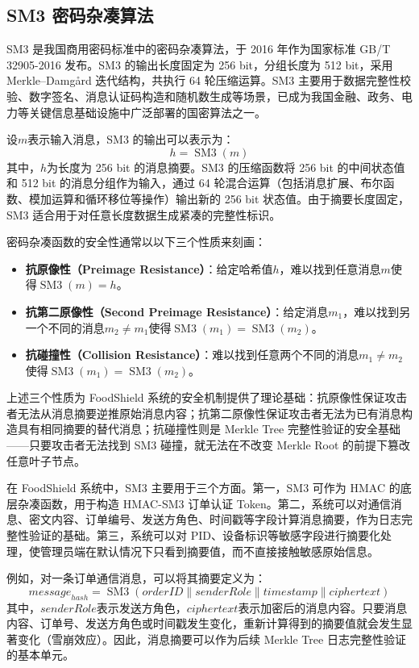 \subsection{SM3 密码杂凑算法}

SM3 是我国商用密码标准中的密码杂凑算法，于 2016 年作为国家标准 GB/T 32905-2016 发布\cite{gb_sm3}。SM3 的输出长度固定为 256 bit，分组长度为 512 bit，采用 Merkle--Damg\r{a}rd 迭代结构，共执行 64 轮压缩运算。SM3 主要用于数据完整性校验、数字签名、消息认证码构造和随机数生成等场景，已成为我国金融、政务、电力等关键信息基础设施中广泛部署的国密算法之一。

设$m$表示输入消息，SM3 的输出可以表示为：
\begin{equation}
h = \operatorname{SM3}(m)
\end{equation}
其中，$h$为长度为 256 bit 的消息摘要。SM3 的压缩函数将 256 bit 的中间状态值和 512 bit 的消息分组作为输入，通过 64 轮混合运算（包括消息扩展、布尔函数、模加运算和循环移位等操作）输出新的 256 bit 状态值。由于摘要长度固定，SM3 适合用于对任意长度数据生成紧凑的完整性标识。

密码杂凑函数的安全性通常以以下三个性质来刻画：

\begin{itemize}[leftmargin=2em]
\item \textbf{抗原像性（Preimage Resistance）}：给定哈希值$h$，难以找到任意消息$m$使得$\operatorname{SM3}(m) = h$。
\item \textbf{抗第二原像性（Second Preimage Resistance）}：给定消息$m_1$，难以找到另一个不同的消息$m_2 \neq m_1$使得$\operatorname{SM3}(m_1) = \operatorname{SM3}(m_2)$。
\item \textbf{抗碰撞性（Collision Resistance）}：难以找到任意两个不同的消息$m_1 \neq m_2$使得$\operatorname{SM3}(m_1) = \operatorname{SM3}(m_2)$。
\end{itemize}

上述三个性质为 FoodShield 系统的安全机制提供了理论基础：抗原像性保证攻击者无法从消息摘要逆推原始消息内容；抗第二原像性保证攻击者无法为已有消息构造具有相同摘要的替代消息；抗碰撞性则是 Merkle Tree 完整性验证的安全基础——只要攻击者无法找到 SM3 碰撞，就无法在不改变 Merkle Root 的前提下篡改任意叶子节点\cite{guo_crypto,stallings2020}。

在 FoodShield 系统中，SM3 主要用于三个方面。第一，SM3 可作为 HMAC 的底层杂凑函数，用于构造 HMAC-SM3 订单认证 Token。第二，系统可以对通信消息、密文内容、订单编号、发送方角色、时间戳等字段计算消息摘要，作为日志完整性验证的基础。第三，系统可以对 PID、设备标识等敏感字段进行摘要化处理，使管理员端在默认情况下只看到摘要值，而不直接接触敏感原始信息。

例如，对一条订单通信消息，可以将其摘要定义为：
\begin{equation}
\mathit{message}_{\mathit{hash}} = \operatorname{SM3}(\mathit{orderID} \parallel \mathit{senderRole} \parallel \mathit{timestamp} \parallel \mathit{ciphertext})
\end{equation}
其中，$\mathit{senderRole}$表示发送方角色，$\mathit{ciphertext}$表示加密后的消息内容。只要消息内容、订单号、发送方角色或时间戳发生变化，重新计算得到的摘要值就会发生显著变化（雪崩效应）。因此，消息摘要可以作为后续 Merkle Tree 日志完整性验证的基本单元。
